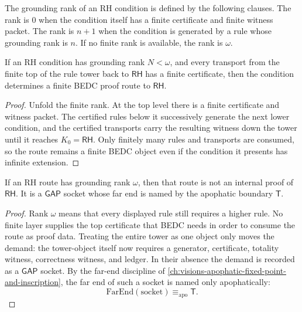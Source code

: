 \begin{definition}
\label{def:rh-grounding-rank}
The grounding rank of an RH condition is defined by the following clauses.
The rank is $0$ when the condition itself has a finite certificate and
finite witness packet.  The rank is $n+1$ when the condition is generated
by a rule whose grounding rank is $n$.  If no finite rank is available, the
rank is $\omega$.
\end{definition}

\begin{theorem}
\label{thm:rh-finite-grounding-rank-route}
If an RH condition has grounding rank $N<\omega$, and every transport from
the finite top of the rule tower back to $\mathsf{RH}$ has a finite
certificate, then the condition determines a finite BEDC proof route to
$\mathsf{RH}$.
\end{theorem}

\begin{proof}
Unfold the finite rank.  At the top level there is a finite certificate and
witness packet.  The certified rules below it successively generate the next
lower condition, and the certified transports carry the resulting witness
down the tower until it reaches $K_0=\mathsf{RH}$.  Only finitely many
rules and transports are consumed, so the route remains a finite BEDC
object even if the condition it presents has infinite extension.
\end{proof}

\begin{theorem}
\label{thm:rh-infinite-rule-tower-socket}
If an RH route has grounding rank $\omega$, then that route is not an
internal proof of $\mathsf{RH}$.  It is a $\mathsf{GAP}$ socket whose far
end is named by the apophatic boundary $\mathsf{T}$.
\end{theorem}

\begin{proof}
Rank $\omega$ means that every displayed rule still requires a higher rule.
No finite layer supplies the top certificate that BEDC needs in order to
consume the route as proof data.  Treating the entire tower as one object
only moves the demand: the tower-object itself now requires a generator,
certificate, totality witness, correctness witness, and ledger.  In their
absence the demand is recorded as a $\mathsf{GAP}$ socket.  By the
far-end discipline of
\autoref{ch:visions-apophatic-fixed-point-and-inscription}, the far end of
such a socket is named only apophatically:
$$
\mathrm{FarEnd}(\mathrm{socket}) \equiv_{\mathrm{apo}} \mathsf{T}.
$$
\end{proof}

